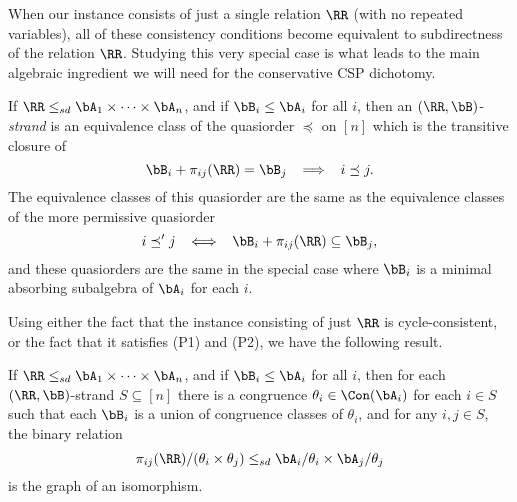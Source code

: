 \begin{center}
\end{center}

When our instance consists of just a single relation $\RR$ (with no repeated variables), all of these consistency conditions become equivalent to subdirectness of the relation $\RR$. Studying this very special case is what leads to the main algebraic ingredient we will need for the conservative CSP dichotomy.

\begin{defn}\label{defn-relation-strand} If $\RR \le_{sd} \bA_1 \times \cdots \times \bA_n$, and if $\bB_i \le \bA_i$ for all $i$, then an $(\RR,\bB)$-\emph{strand} is an equivalence class of the quasiorder $\preceq$ on $[n]$ which is the transitive closure of
\[
\bB_i + \pi_{ij}(\RR) = \bB_j \;\; \implies \;\; i \preceq j.
\]
The equivalence classes of this quasiorder are the same as the equivalence classes of the more permissive quasiorder
\[
i \preceq' j \;\; \iff \;\; \bB_i + \pi_{ij}(\RR) \subseteq \bB_j,
\]
and these quasiorders are the same in the special case where $\bB_i$ is a minimal absorbing subalgebra of $\bA_i$ for each $i$.
\end{defn}

Using either the fact that the instance consisting of just $\RR$ is cycle-consistent, or the fact that it satisfies (P1) and (P2), we have the following result.

\begin{prop}\label{prop-relation-strand} If $\RR \le_{sd} \bA_1 \times \cdots \times \bA_n$, and if $\bB_i \le \bA_i$ for all $i$, then for each $(\RR,\bB)$-strand $S \subseteq [n]$ there is a congruence $\theta_i \in \Con(\bA_i)$ for each $i \in S$ such that each $\bB_i$ is a union of congruence classes of $\theta_i$, and for any $i,j \in S$, the binary relation
\[
\pi_{ij}(\RR)/(\theta_i\times\theta_j) \le_{sd} \bA_i/\theta_i \times \bA_j/\theta_j
\]
is the graph of an isomorphism.
\end{prop}

